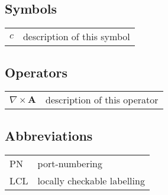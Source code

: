 
\subsection*{Symbols}

\begin{tabular}{ll}
$c$              & description of this symbol\\
\end{tabular}

\subsection*{Operators}

\begin{tabular}{ll}
$\nabla \times \mathbf{A}$              & description of this operator\\
\end{tabular}

\subsection*{Abbreviations}

\begin{tabular}{ll}
PN              & port-numbering\\
LCL             & locally checkable labelling\\
\end{tabular}
